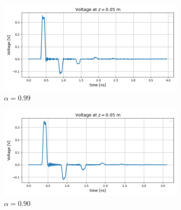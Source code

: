 \begin{figure}[! h]
\centering
\begin{subfigure}{.5\textwidth}
  \centering
  \includegraphics[width=.9\linewidth]{figures/alpha=0.99.png}
  \caption{$\alpha = 0.99$}
  \label{fig:dt1}
\end{subfigure}%
\begin{subfigure}{.5\textwidth}
  \centering
  \includegraphics[width=.9\linewidth]{figures/alpha=0.90.png}
  \caption {$\alpha = 0.90$}
  \label{fig:dt2}
\end{subfigure}
\caption{}
\label{fig:alpha}
\end{figure}